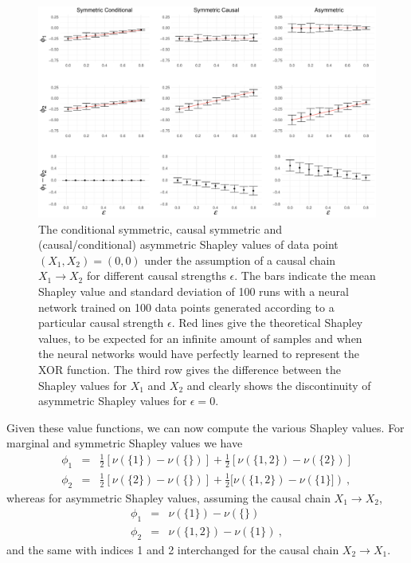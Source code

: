 \documentclass{article}
\begin{document}
\begin{figure}[t]
	\centering
	\includegraphics[width=\textwidth]{figures/XOR_plot.pdf}
	\caption{The conditional symmetric, causal symmetric and (causal/conditional) asymmetric Shapley values of data point $(X_1,X_2) = (0,0)$ under the assumption of a causal chain $X_1 \rightarrow X_2$ for different causal strengths $\epsilon$. The bars indicate the mean Shapley value and standard deviation of 100 runs with a neural network trained on 100 data points generated according to a particular causal strength $\epsilon$. Red lines give the theoretical Shapley values, to be expected for an infinite amount of samples and when the neural networks would have perfectly learned to represent the XOR function. The third row gives the difference between the Shapley values for $X_1$ and $X_2$ and clearly shows the discontinuity of asymmetric Shapley values for $\epsilon = 0$.
	}
	\label{fig:xor_plot}
\end{figure}


Given these value functions, we can now compute the various Shapley values. For marginal and symmetric Shapley values we have
\begin{eqnarray}
\phi_1 & = & \frac{1}{2}[\nu(\{1\}) - \nu(\{\})] + \frac{1}{2}[\nu(\{1,2\}) - \nu(\{2\})] \nonumber \\
\phi_2 & = & \frac{1}{2}[\nu(\{2\}) - \nu(\{\})] + \frac{1}{2}[\nu(\{1,2\}) - \nu(\{1\}]) \: , \nonumber
\end{eqnarray}
whereas for asymmetric Shapley values, assuming the causal chain $X_1 \rightarrow X_2$,
\begin{eqnarray}
\phi_1 & = & \nu(\{1\}) - \nu(\{\}) \nonumber \\
\phi_2 & = & \nu(\{1,2\}) - \nu(\{1\}) \: , \nonumber
\end{eqnarray}
and the same with indices 1 and 2 interchanged for the causal chain $X_2 \rightarrow X_1$.
\end{document}
